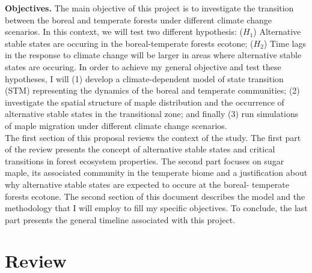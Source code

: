 \textbf{Objectives.} The main objective of this project is to investigate the
transition between the boreal and temperate forests under different climate
change scenarios. In this context, we will test two
different hypothesis: ($H_1$) Alternative stable states are occuring in the
boreal-temperate forests ecotone;  ($H_2$) Time lags in the response to
climate change will be larger in areas where alternative stable states are
occuring. In order to achieve my general objective and test these hypotheses,
I will (1) develop a climate-dependent model of state transition (STM)
representing the dynamics of the boreal and temperate communities; (2) investigate
the spatial structure of maple distribution and the occurrence of alternative
stable states in the transitional zone; and finally (3) run simulations of
maple migration under different climate change scenarios. \\

The first section of this proposal reviews the context of the study. The first
part of the review presents the concept of alternative stable states and
critical transitions in forest ecosystem properties. The second part focuses
on sugar maple, its associated community in the temperate biome and a
justification about why alternative stable states are expected to occure at
the boreal- temperate forests ecotone. The second section of this document
describes the model and the methodology that I will employ to fill my specific
objectives. To conclude, the last part presents the general timeline
associated with this project.

\section{Review} 

